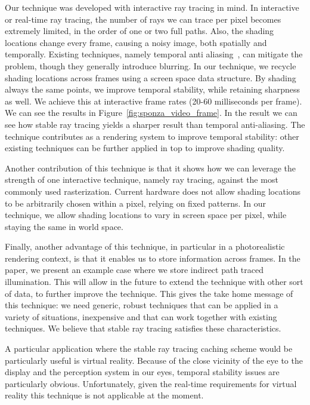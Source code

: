 Our technique was developed with interactive ray tracing in mind. In interactive or real-time ray tracing, the number of rays we can trace per pixel becomes extremely limited, in the order of one or two full paths. Also, the shading locations change every frame, causing a noisy image, both spatially and temporally. Existing techniques, namely temporal anti aliasing~\cite{Karis2014}, can mitigate the problem, though they generally introduce blurring. In our technique, we recycle shading locations across frames using a screen space data structure. By shading always the same points, we improve temporal stability, while retaining sharpness as well. We achieve this at interactive frame rates (20-60 milliseconds per frame). We can see the results in Figure~\ref{fig:sponza_video_frame}. In the result we can see how stable ray tracing yields a sharper result than temporal anti-aliasing. The technique contributes as a rendering system to improve temporal stability: other existing techniques can be further applied in top to improve shading quality. 

Another contribution of this technique is that it shows how we can leverage the strength of one interactive technique, namely ray tracing, against the most commonly used rasterization. Current hardware does not allow shading locations to be arbitrarily chosen within a pixel, relying on fixed patterns. In our technique, we allow shading locations to vary in screen space per pixel, while staying the same in world space. 

Finally, another advantage of this technique, in particular in a photorealistic rendering context, is that it enables us to store information across frames. In the paper, we present an example case where we store indirect path traced illumination. This will allow in the future to extend the technique with other sort of data, to further improve the technique. This gives the take home message of this technique: we need generic, robust techniques that can be applied in a variety of situations, inexpensive and that can work together with existing techniques. We believe that stable ray tracing satisfies these characteristics. 

A particular application where the stable ray tracing caching scheme would be particularly useful is virtual reality. Because of the close vicinity of the eye to the display and the perception system in our eyes, temporal stability issues are particularly obvious. Unfortunately, given the real-time requirements for virtual reality this technique is not applicable at the moment.

